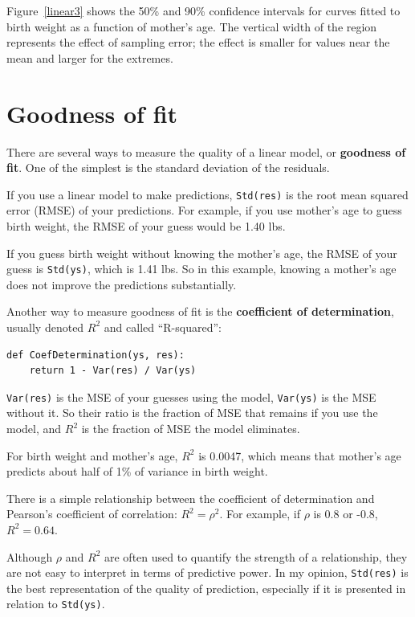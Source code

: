 \documentclass[12pt]{book}
\begin{document}
Figure~\ref{linear3} shows the 50\% and 90\% confidence
intervals for curves fitted to birth weight as a function of
mother's age.
  The vertical width of the region represents the effect of
sampling error; the effect is smaller for values near the mean and
larger for the extremes.


\section{Goodness of fit}
\label{goodness}

There are several ways to measure the quality of a linear model, or
{\bf goodness of fit}.  One of the simplest is the standard deviation
of the residuals.

If you use a linear model to make predictions, \verb"Std(res)"
is the root mean squared error (RMSE) of your predictions.  For
example, if you use mother's age to guess birth weight, the RMSE of
your guess would be 1.40 lbs.

If you guess birth weight without knowing the mother's age, the RMSE
of your guess is \verb"Std(ys)", which is 1.41 lbs.  So in this
example, knowing a mother's age does not improve the predictions
substantially.

Another way to measure goodness of fit is  the {\bf
  coefficient of determination}, usually denoted $R^2$ and 
called ``R-squared'':

\begin{verbatim}
def CoefDetermination(ys, res):
    return 1 - Var(res) / Var(ys)
\end{verbatim}

\verb"Var(res)" is the MSE of your guesses using the model,
\verb"Var(ys)" is the MSE without it.   So their ratio is the fraction
of MSE that remains if you use the model, and $R^2$ is the fraction
of MSE the model eliminates.

For birth weight and mother's age, $R^2$ is 0.0047, which means
that mother's age predicts about half of 1\% of variance in
birth weight.

There is a simple relationship between the coefficient of
determination and Pearson's coefficient of correlation: $R^2 = \rho^2$.
For example, if $\rho$ is 0.8 or -0.8, $R^2 = 0.64$.

Although $\rho$ and $R^2$ are often used to quantify the strength of a
relationship, they are not easy to interpret in terms of predictive
power.  In my opinion, \verb"Std(res)" is the best representation
of the quality of prediction, especially if it is presented
in relation to \verb"Std(ys)".
\end{document}
